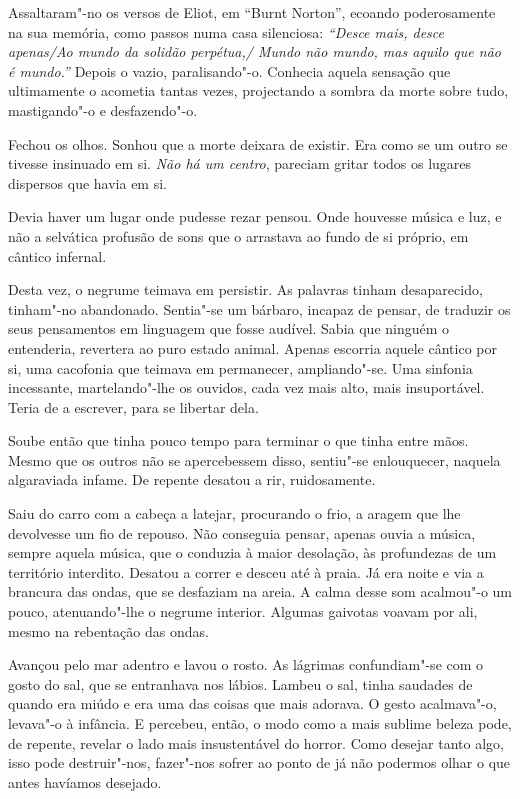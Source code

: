 Assaltaram"-no os versos de Eliot, em ``Burnt Norton'', ecoando
poderosamente na sua memória, como passos numa casa silenciosa:\emph{
``Desce mais, desce apenas/Ao mundo da solidão perpétua,/ Mundo não
mundo, mas aquilo que não é mundo.''} Depois o vazio, paralisando"-o.
Conhecia aquela sensação que ultimamente o acometia tantas vezes,
projectando a sombra da morte sobre tudo, mastigando"-o e desfazendo"-o.

Fechou os olhos. Sonhou que a morte deixara de existir. Era como se um
outro se tivesse insinuado em si. \emph{Não há um centro}, pareciam gritar
todos os lugares dispersos que havia em si.

Devia haver um lugar onde pudesse rezar pensou. Onde houvesse música e
luz, e não a selvática profusão de sons que o arrastava ao fundo de si
próprio, em cântico infernal.

Desta vez, o negrume teimava em persistir. As palavras tinham
desaparecido, tinham"-no abandonado. Sentia"-se um bárbaro, incapaz de
pensar, de traduzir os seus pensamentos em linguagem que fosse audível.
Sabia que ninguém o entenderia, revertera ao puro estado animal. Apenas
escorria aquele cântico por si, uma cacofonia que teimava em permanecer,
ampliando"-se. Uma sinfonia incessante, martelando"-lhe os ouvidos, cada
vez mais alto, mais insuportável. Teria de a escrever, para se libertar
dela.

Soube então que tinha pouco tempo para terminar o que tinha entre mãos.
Mesmo que os outros não se apercebessem disso, sentiu"-se enlouquecer,
naquela algaraviada infame. De repente desatou a rir, ruidosamente.

Saiu do carro com a cabeça a latejar, procurando o frio, a aragem que
lhe devolvesse um fio de repouso. Não conseguia pensar, apenas ouvia a
música, sempre aquela música, que o conduzia à maior desolação, às
profundezas de um território interdito. Desatou a correr e desceu até à
praia. Já era noite e via a brancura das ondas, que se desfaziam na
areia. A calma desse som acalmou"-o um pouco, atenuando"-lhe o negrume
interior. Algumas gaivotas voavam por ali, mesmo na rebentação das
ondas.

Avançou pelo mar adentro e lavou o rosto. As lágrimas confundiam"-se com
o gosto do sal, que se entranhava nos lábios. Lambeu o sal, tinha
saudades de quando era miúdo e era uma das coisas que mais adorava. O
gesto acalmava"-o, levava"-o à infância. E percebeu, então, o modo como a
mais sublime beleza pode, de repente, revelar o lado mais insustentável
do horror. Como desejar tanto algo, isso pode destruir"-nos, fazer"-nos
sofrer ao ponto de já não podermos olhar o que antes havíamos desejado.

